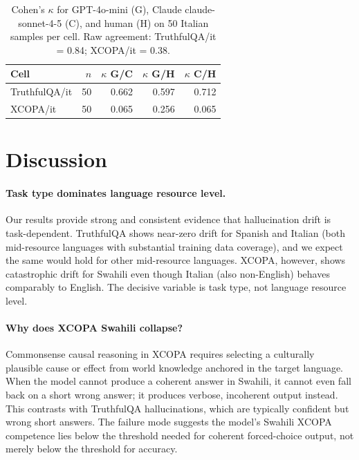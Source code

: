 \documentclass[11pt]{article}
\begin{document}
\begin{table}[t]
\centering
\small
\begin{tabular}{lrrrr}
\toprule
\textbf{Cell} & \textbf{$n$} & \textbf{$\kappa$ G/C} & \textbf{$\kappa$ G/H} & \textbf{$\kappa$ C/H} \\
\midrule
TruthfulQA/it & 50 & 0.662 & 0.597 & 0.712 \\
XCOPA/it      & 50 & 0.065 & 0.256 & 0.065 \\
\bottomrule
\end{tabular}
\caption{Cohen's $\kappa$ for GPT-4o-mini (G), Claude claude-sonnet-4-5 (C), and
human (H) on 50 Italian samples per cell. Raw agreement: TruthfulQA/it = 0.84;
XCOPA/it = 0.38.}
\label{tab:kappa}
\end{table}

\section{Discussion}

\paragraph{Task type dominates language resource level.}
Our results provide strong and consistent evidence that hallucination drift is
task-dependent. TruthfulQA shows near-zero drift for Spanish and Italian
(both mid-resource languages with substantial training data coverage), and we
expect the same would hold for other mid-resource languages. XCOPA, however,
shows catastrophic drift for Swahili even though Italian (also non-English)
behaves comparably to English. The decisive variable is task type, not language
resource level.

\paragraph{Why does XCOPA Swahili collapse?}
Commonsense causal reasoning in XCOPA requires selecting a culturally plausible
cause or effect from world knowledge anchored in the target language. When the
model cannot produce a coherent answer in Swahili, it cannot even fall back on
a short wrong answer; it produces verbose, incoherent output instead. This
contrasts with TruthfulQA hallucinations, which are typically confident but
wrong short answers. The failure mode suggests the model's Swahili XCOPA
competence lies below the threshold needed for coherent forced-choice output,
not merely below the threshold for accuracy.
\end{document}

